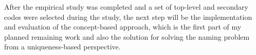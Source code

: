 
After the empirical study was completed and a set of top-level and secondary codes were selected during the study, the next step will be the implementation and evaluation of the concept-based approach, which is the first part of my planned remaining work and also the solution for solving the naming problem from a uniqueness-based perspective.